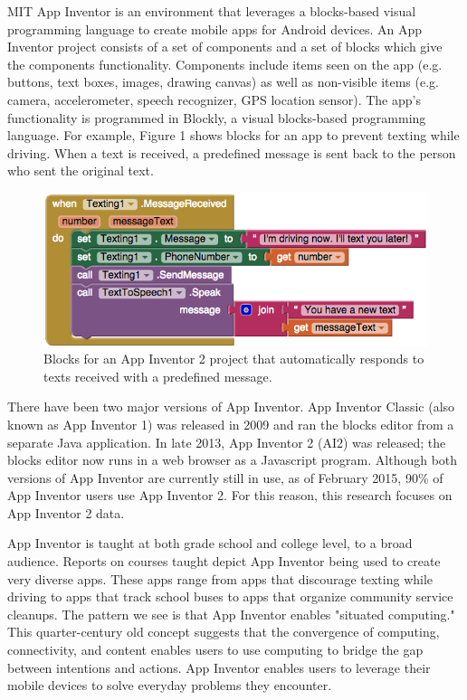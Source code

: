 \documentclass[conference]{IEEEtran}
\begin{document}
 

MIT App Inventor is an environment that leverages a blocks-based visual programming language to create mobile apps for Android devices. An App Inventor project consists of a set of components and a set of blocks which give the components functionality. Components include items seen on the app (e.g. buttons, text boxes, images, drawing canvas) as well as non-visible items (e.g. camera, accelerometer, speech recognizer, GPS location sensor). The app's functionality is programmed in Blockly, a visual blocks-based programming language. For example, Figure 1 shows blocks for an app to prevent texting while driving. When a text is received, a predefined message is sent back to the person who sent the original text.

\begin{figure}[h!]
	\centering
	\includegraphics[width=0.95\linewidth]{fig1.png}
	\caption{Blocks for an App Inventor 2 project that automatically responds to texts received with a predefined message.}
	\label{FIgure 1: Label}
\end{figure}

There have been two major versions of App Inventor. App Inventor Classic (also known as App Inventor 1) was released in 2009 and ran the blocks editor from a separate Java application. In late 2013, App Inventor 2 (AI2) was released; the blocks editor now runs in a web browser as a Javascript program.\cite{naming:turbak} Although both versions of App Inventor are currently still in use, as of February 2015, 90\% of App Inventor users use App Inventor 2.\cite{ai_usage} For this reason, this research focuses on App Inventor 2 data.

App Inventor is taught at both grade school and college level, to a broad audience. Reports on courses taught depict App Inventor being used to create very diverse apps. These apps range from apps that discourage texting while driving to apps that track school buses to apps that organize community service cleanups.\cite{thinking:turbak} The pattern we see is that App Inventor enables "situated computing." This quarter-century old concept suggests that the convergence of computing, connectivity, and content enables users to use computing to bridge the gap between intentions and actions. App Inventor enables users to leverage their mobile devices to solve everyday problems they encounter. \cite{situated:hirakawa}
\end{document}
